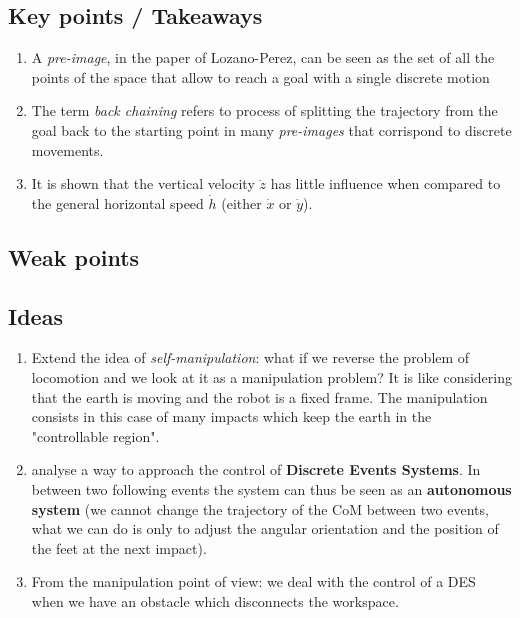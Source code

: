 \subsection*{Key points / Takeaways}
\begin{enumerate}
\item A \textit{pre-image}, in the paper of Lozano-Perez, can be seen as the set of all the points of the space that allow to reach a goal with a single discrete motion
\item The term \textit{back chaining} refers to process of splitting the trajectory from the goal back to the starting point in many \textit{pre-images} that corrispond to discrete movements.
\item It is shown that the vertical velocity $\dot{z}$ has little influence when compared to the general horizontal speed $\dot{h}$ (either $\dot{x}$ or $\dot{y}$).
\end{enumerate}
\subsection*{Weak points}
\subsection*{Ideas}
\begin{enumerate}
\item Extend the idea of \textit{self-manipulation}: what if we reverse the problem of locomotion and we look at it as a manipulation problem? It is like considering that the earth is moving and the robot is a fixed frame. The manipulation consists in this case of many impacts which keep the earth in the "controllable region". 
\item analyse a way to approach the control of \textbf{Discrete Events Systems}. In between two following events the system can thus be seen as an \textbf{autonomous system} (we cannot change the trajectory of the CoM between two events, what we can do is only to adjust the angular orientation and the position of the feet at the next impact).
\item From the manipulation point of view: we deal with the control of a DES when we have an obstacle which disconnects the workspace.
\end{enumerate}